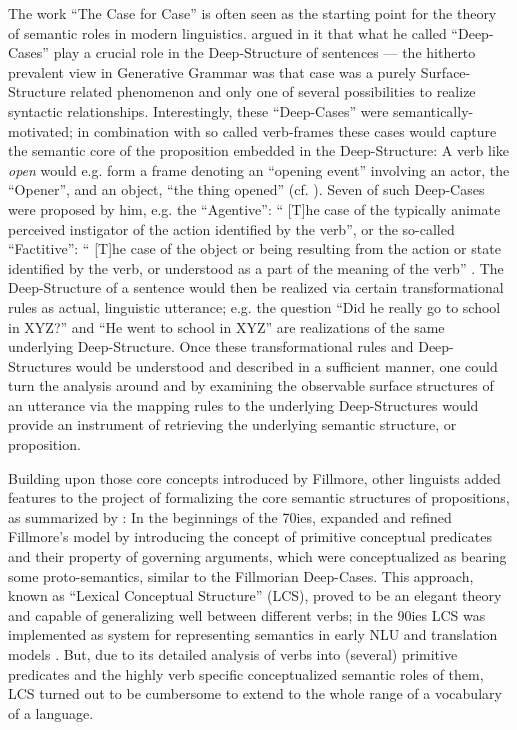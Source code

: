 The work ``The Case for Case'' \citep{fillmore1967case} is often seen as the starting point
for the theory of semantic roles in modern linguistics. \citeauthor{fillmore1967case}
argued in it that what he called ``Deep-Cases'' play a crucial role in the Deep-Structure
of sentences --- the hitherto prevalent view in Generative Grammar was that case was a
purely Surface-Structure related phenomenon and only one of several possibilities to realize
syntactic relationships. Interestingly, these ``Deep-Cases'' were semantically-motivated; in
combination with so called verb-frames these cases would capture the semantic core of the
proposition embedded in the Deep-Structure: A verb like \emph{open} would e.g. form a frame
denoting an ``opening event'' involving an actor, the ``Opener'', and an object, ``the thing
opened'' (cf. \cite[p.~46f.]{fillmore1967case}). Seven of such Deep-Cases were proposed by
him, e.g. the ``Agentive'': `` [T]he case of the typically animate perceived instigator of
the action identified by the verb'', or the so-called ``Factitive'': `` [T]he case of the
object or being resulting from the action or state identified by the verb, or understood as
a part of the meaning of the verb'' \citep[p.~46]{fillmore1967case}. The Deep-Structure of
a sentence would then be realized via certain transformational rules as actual, linguistic
utterance; e.g. the question ``Did he really go to school in XYZ?'' and ``He went to school
in XYZ'' are realizations of the same underlying Deep-Structure. Once these transformational
rules and Deep-Structures would be understood and described in a sufficient manner, one could
turn the analysis around and by examining the observable surface structures of an utterance
via the mapping rules to the underlying Deep-Structures would provide an instrument of
retrieving the underlying semantic structure, or proposition.

Building upon those core concepts introduced by Fillmore, other linguists added
features to the project of formalizing the core semantic structures of propositions,
as summarized by \citeauthor{palmer2010semantic}: In the beginnings of the 70ies,
\cite{jackendoff1972semantic} expanded and refined Fillmore's model by introducing the
concept of primitive conceptual predicates and their property of governing arguments,
which were conceptualized as bearing some proto-semantics, similar to the Fillmorian
Deep-Cases. This approach, known as ``Lexical Conceptual Structure'' (LCS), proved
to be an elegant theory and capable of generalizing well between different verbs; in
the 90ies LCS was implemented as system for representing semantics in early NLU and
translation models \citep{palmer2010semantic}. But, due to its detailed analysis of
verbs into (several) primitive predicates and the highly verb specific conceptualized
semantic roles of them, LCS turned out to be cumbersome to extend to the whole range
of a vocabulary of a language.

